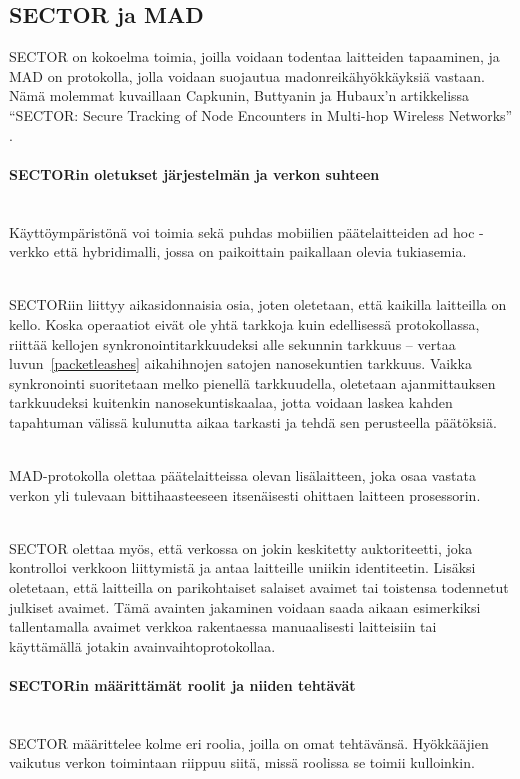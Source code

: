 \documentclass[finnish]{tktltiki2}
\theoremstyle{definition}
\theoremstyle{remark}
\begin{document}
% 
% 
% 
% 
% 
% 
% 
% 
% 
% 
% 
% 
\subsection{SECTOR ja MAD}
% 
% 
% 
% 
% 
% 
% 
% 
% 
% 
% 
% 
% 
% 
% 
% 

SECTOR on kokoelma toimia, joilla voidaan todentaa laitteiden tapaaminen, ja MAD on protokolla, jolla voidaan suojautua madonreikähyökkäyksiä vastaan. Nämä molemmat kuvaillaan Capkunin, Buttyanin ja Hubaux'n artikkelissa ``SECTOR: Secure Tracking of Node Encounters in Multi-hop Wireless Networks'' \cite{sector}.

\paragraph{SECTORin oletukset järjestelmän ja verkon suhteen}
\noindent \\
Käyttöympäristönä voi toimia sekä puhdas mobiilien päätelaitteiden ad hoc -verkko että hybridimalli, jossa on paikoittain paikallaan olevia tukiasemia. 

\noindent \\
SECTORiin liittyy aikasidonnaisia osia, joten oletetaan, että kaikilla laitteilla on kello. Koska operaatiot eivät ole yhtä tarkkoja kuin edellisessä protokollassa, riittää kellojen synkronointitarkkuudeksi alle sekunnin tarkkuus -- vertaa luvun~\ref{packetleashes} aikahihnojen satojen nanosekuntien tarkkuus. Vaikka synkronointi suoritetaan melko pienellä tarkkuudella, oletetaan ajanmittauksen tarkkuudeksi kuitenkin nanosekuntiskaalaa, jotta voidaan laskea kahden tapahtuman välissä kulunutta aikaa tarkasti ja tehdä sen perusteella päätöksiä.

\noindent\\
MAD-protokolla olettaa päätelaitteissa olevan lisälaitteen, joka osaa vastata verkon yli tulevaan bittihaasteeseen itsenäisesti ohittaen laitteen prosessorin.

\noindent\\
SECTOR olettaa myös, että verkossa on jokin keskitetty auktoriteetti, joka kontrolloi verkkoon liittymistä ja antaa laitteille uniikin identiteetin. Lisäksi oletetaan, että laitteilla on parikohtaiset salaiset avaimet tai toistensa todennetut julkiset avaimet. Tämä avainten jakaminen voidaan saada aikaan esimerkiksi tallentamalla avaimet verkkoa rakentaessa manuaalisesti laitteisiin tai käyttämällä jotakin avainvaihtoprotokollaa.

\paragraph{SECTORin määrittämät roolit ja niiden tehtävät}
\label{sector-roles}
\noindent\\
SECTOR määrittelee kolme eri roolia, joilla on omat tehtävänsä. Hyökkääjien vaikutus verkon toimintaan riippuu siitä, missä roolissa se toimii kulloinkin.
\end{document}
